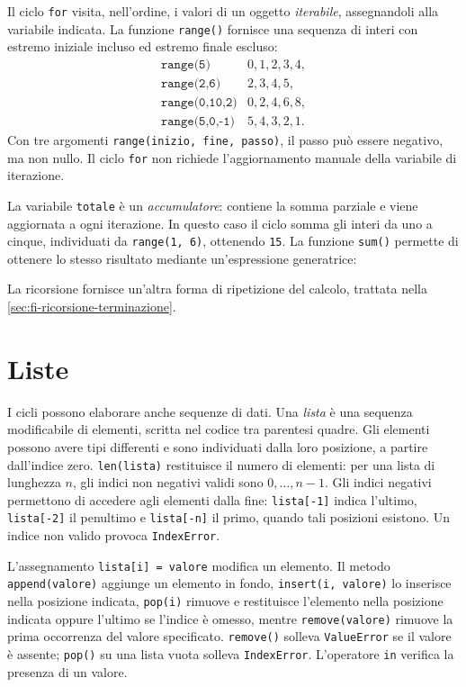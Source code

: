 Il ciclo \texttt{for} visita, nell'ordine, i valori di un oggetto
\emph{iterabile}, assegnandoli alla variabile indicata. La funzione
\texttt{range()} fornisce una sequenza di interi con estremo iniziale
incluso ed estremo finale escluso:
\[
\begin{array}{ll}
  \texttt{range(5)} & 0,1,2,3,4,\\
  \texttt{range(2,6)} & 2,3,4,5,\\
  \texttt{range(0,10,2)} & 0,2,4,6,8,\\
  \texttt{range(5,0,-1)} & 5,4,3,2,1.
\end{array}
\]
Con tre argomenti \texttt{range(inizio, fine, passo)}, il passo può
essere negativo, ma non nullo. Il ciclo \texttt{for} non richiede
l'aggiornamento manuale della variabile di iterazione.



La variabile \texttt{totale} è un \emph{accumulatore}: contiene la somma
parziale e viene aggiornata a ogni iterazione. In questo caso il ciclo
somma gli interi da uno a cinque, individuati da \texttt{range(1, 6)},
ottenendo \texttt{15}. La funzione \texttt{sum()} permette di ottenere
lo stesso risultato mediante un'espressione generatrice:



La ricorsione fornisce un'altra forma di ripetizione del calcolo,
trattata nella \cref{sec:fi-ricorsione-terminazione}.

\section{Liste}
\label{sec:fi-python-liste}

I cicli possono elaborare anche sequenze di dati. Una \emph{lista} è
una sequenza modificabile di elementi, scritta nel codice tra
parentesi quadre. Gli elementi possono avere tipi differenti e sono
individuati dalla loro posizione, a partire dall'indice zero.
\texttt{len(lista)} restituisce il numero di elementi:
per una lista di lunghezza \(n\), gli indici non negativi validi sono
\(0,\ldots,n-1\). Gli indici negativi permettono di accedere agli
elementi dalla fine: \texttt{lista[-1]} indica l'ultimo,
\texttt{lista[-2]} il penultimo e \texttt{lista[-n]} il primo,
quando tali posizioni esistono. Un indice non valido provoca \texttt{IndexError}.

L'assegnamento \texttt{lista[i] = valore} modifica un elemento.
Il metodo \texttt{append(valore)} aggiunge un elemento in fondo,
\texttt{insert(i, valore)} lo inserisce nella posizione indicata,
\texttt{pop(i)} rimuove e restituisce l'elemento nella posizione
indicata oppure l'ultimo se l'indice è omesso, mentre
\texttt{remove(valore)} rimuove la prima occorrenza del valore
specificato. \texttt{remove()} solleva \texttt{ValueError} se il valore
è assente; \texttt{pop()} su una lista vuota solleva \texttt{IndexError}.
L'operatore \texttt{in} verifica la presenza di un valore.

